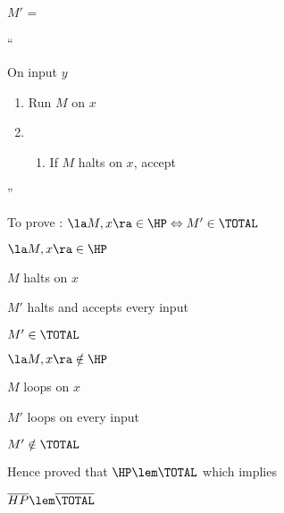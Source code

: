 \begin{enumerate}
$M'$ =

``

On input $y$
\begin{enumerate}
    \item Run $M$ on $x$
    \item \begin{enumerate}
        \item If $M$ halts on $x$, accept
    \end{enumerate}
\end{enumerate}

''

To prove : $\la M, x \ra \in \HP \Leftrightarrow M' \in \TOTAL$

$\la M, x \ra \in \HP$

\imp
$M$ halts on $x$

\imp
$M'$ halts and accepts every input

\imp
$M' \in \TOTAL$

$\la M, x \ra \notin \HP$

\imp
$M$ loops on $x$

\imp
$M'$ loops on every input 

\imp
$M' \notin \TOTAL$

Hence proved that $\HP \lem \TOTAL$ which implies 

$\overline{HP} \lem \overline{\TOTAL}$







\end{enumerate}    

    
    
    

    
    

